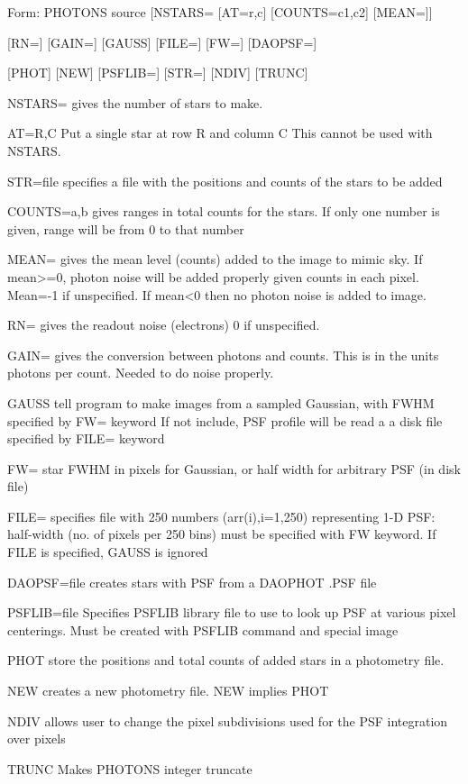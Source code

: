\begin{command}
  \item[Form: PHOTONS source [NSTARS=] [AT=r,c] [COUNTS=c1,c2] [MEAN=]\hfill]{}
  \item{[RN=] [GAIN=] [GAUSS] [FILE=] [FW=] [DAOPSF=]}
  \item{[PHOT] [NEW] [PSFLIB=] [STR=] [NDIV] [TRUNC]}
  \item[NSTARS=]{gives the number of stars to make.}
  \item[AT=R,C]{Put a single star at row R and column C
       This cannot be used with NSTARS.}
  \item[STR=file]{specifies a file with the positions and
       counts of the stars to be added}
  \item[COUNTS=a,b]{gives ranges in total counts for the
       stars. If only one number is given, range will be from 0 to that number}
  \item[MEAN=]{gives the mean level (counts) added to the image to mimic
       sky. If mean>=0, photon noise will be added properly given counts in
       each pixel.  Mean=-1 if unspecified. If mean<0 then no photon noise
       is added to image. }
  \item[RN=]{ gives the readout noise (electrons) 0 if unspecified. }
  \item[GAIN=]{gives the conversion between photons and counts.  This is in
       the units photons per count. Needed to do noise properly.}
  \item[GAUSS ]{tell program to make images from a sampled Gaussian, with
       FWHM specified by FW= keyword If not include, PSF profile will be
       read a a disk file specified by FILE= keyword}
  \item[FW=]{star FWHM in pixels for Gaussian, or half width for arbitrary
       PSF (in disk file)}
  \item[FILE=]{ specifies file with 250 numbers (arr(i),i=1,250)
       representing 1-D PSF: half-width (no. of pixels per 250 bins) must
       be specified with FW keyword.  If FILE is specified, GAUSS is
       ignored}
  \item[DAOPSF=file]{creates stars with PSF from a DAOPHOT .PSF file}
  \item[PSFLIB=file]{Specifies PSFLIB library file to use to look up PSF at
       various pixel centerings. Must be created with PSFLIB command and
       special image}
  \item[PHOT]{store the positions and total counts of added
       stars in a photometry file. }
  \item[NEW]{creates a new photometry file.  NEW implies PHOT}
  \item[NDIV]{allows user to change the pixel subdivisions
       used for the PSF integration over pixels}
  \item[TRUNC]{Makes PHOTONS integer truncate}
\end{command}

